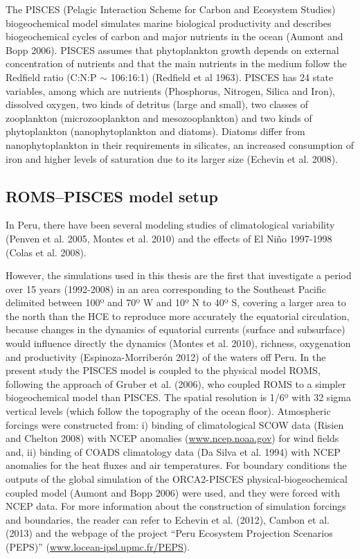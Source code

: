 The PISCES (Pelagic Interaction Scheme for Carbon and Ecosystem Studies) biogeochemical model simulates marine biological productivity and describes biogeochemical cycles of carbon and major nutrients in the ocean (Aumont and Bopp 2006). PISCES assumes that phytoplankton growth depends on external concentration of nutrients and that the main nutrients in the medium follow the Redfield ratio (C:N:P $\sim$ 106:16:1) (Redfield et al 1963). PISCES has 24 state variables, among which are nutrients (Phosphorus, Nitrogen, Silica and Iron), dissolved oxygen, two kinds of detritus (large and small), two classes of zooplankton (microzooplankton and mesozooplankton) and two kinds of phytoplankton (nanophytoplankton and diatoms). Diatoms differ from nanophytoplankton in their requirements in silicates, an increased consumption of iron and higher levels of saturation due to its larger size (Echevin et al. 2008).

\subsection{ROMS--PISCES model setup}

In Peru, there have been several modeling studies of climatological variability (Penven et al. 2005, Montes et al. 2010) and the effects of El Niño 1997-1998 (Colas et al. 2008). 

However, the simulations used in this thesis are the first that investigate a period over 15 years (1992-2008) in an area corresponding to the Southeast Pacific delimited between 100º and 70º W and 10º N to 40º S, covering a larger area to the north than the HCE to reproduce more accurately the equatorial circulation, because changes in the dynamics of equatorial currents (surface and subsurface) would influence directly the dynamics (Montes et al. 2010), richness, oxygenation and productivity (Espinoza-Morriberón 2012) of the waters off Peru. In the present study the PISCES model is coupled to the physical model ROMS, following the approach of Gruber et al. (2006), who coupled ROMS to a simpler biogeochemical model than PISCES. The spatial resolution is 1/6º with 32 sigma vertical levels (which follow the topography of the ocean floor). Atmospheric forcings were constructed from: i) binding of climatological SCOW data (Risien and Chelton 2008) with NCEP anomalies (\url{www.ncep.noaa.gov}) for wind fields and, ii) binding of COADS climatology data (Da Silva et al. 1994) with NCEP anomalies for the heat fluxes and air temperatures. For boundary conditions the outputs of the global simulation of the ORCA2-PISCES physical-biogeochemical coupled model (Aumont and Bopp 2006) were used, and they were forced with NCEP data. For more information about the construction of simulation forcings and boundaries, the reader can refer to Echevin et al. (2012), Cambon et al. (2013) and the webpage of the project ``Peru Ecosystem Projection Scenarios (PEPS)'' (\url{www.locean-ipsl.upmc.fr/PEPS}).

